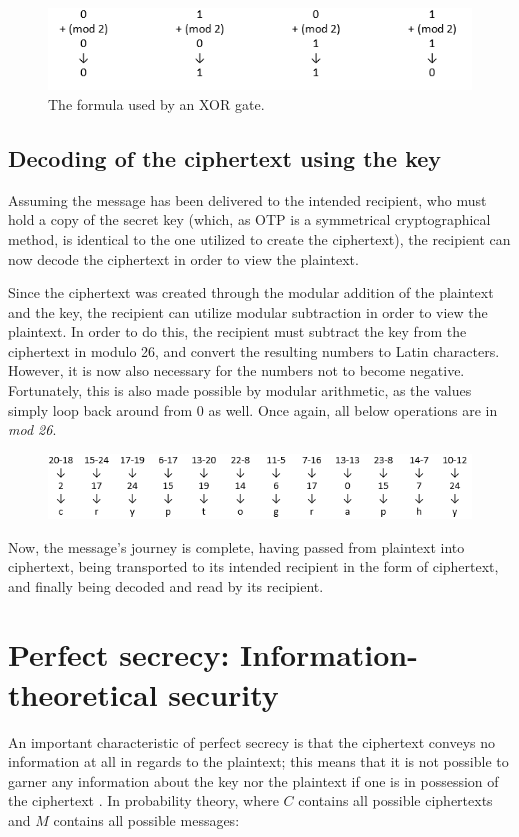 \documentclass[12pt]{report}
\theoremstyle{definition}
\theoremstyle{remark}
\begin{document}
\begin{figure}[H]
\centering
\includegraphics[scale=1]{XORgate.PNG}
\caption{The formula used by an XOR gate.}
\end{figure}

\subsection{Decoding of the ciphertext using the key}
Assuming the message has been delivered to the intended recipient, who must hold a copy of the secret key (which, as OTP is a symmetrical cryptographical method, is identical to the one utilized to create the ciphertext), the recipient can now decode the ciphertext in order to view the plaintext.

Since the ciphertext was created through the modular addition of the plaintext and the key, the recipient can utilize modular subtraction in order to view the plaintext. In order to do this, the recipient must subtract the key from the ciphertext in modulo 26, and convert the resulting numbers to Latin characters.  However, it is now also necessary for the numbers not to become negative. Fortunately, this is also made possible by modular arithmetic, as the values simply loop back around from 0 as well. Once again, all below operations are in \textit{mod 26}.

\begin{figure}[H]
\centering
\includegraphics[scale=1]{Table4.PNG}
\end{figure}

Now, the message's journey is complete, having passed from plaintext into ciphertext, being transported to its intended recipient in the form of ciphertext, and finally being decoded and read by its recipient. 

\section{Perfect secrecy: Information-theoretical security}
An important characteristic of perfect secrecy is that the ciphertext conveys no information at all in regards to the plaintext; this means that it is not possible to garner any information about the key nor the plaintext if one is in possession of the ciphertext \cite{PerfectSecrecy} \cite{HandbookOfAppliedCryptography}. In probability theory, where $C$ contains all possible ciphertexts and $M$ contains all possible messages:
\end{document}
